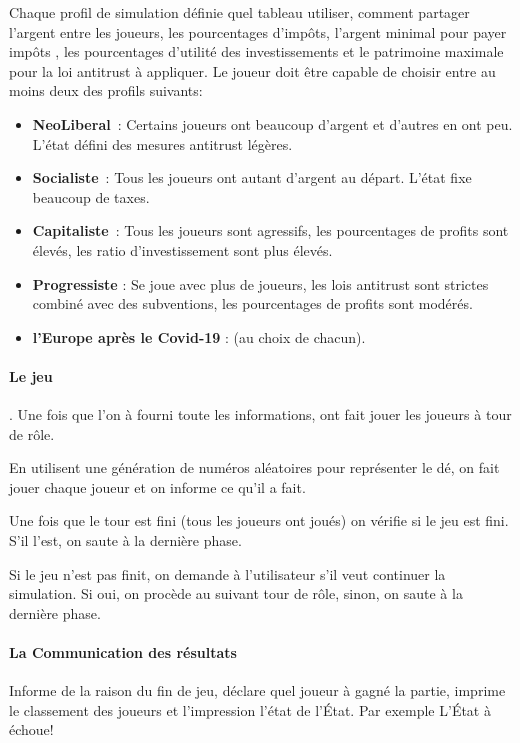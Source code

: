 \documentclass[12pt]{article}
\begin{document}
  Chaque profil de simulation définie quel tableau utiliser, comment partager l'argent entre les joueurs, les pourcentages d'impôts, l'argent minimal pour payer impôts , les pourcentages d'utilité des investissements et le patrimoine maximale pour la loi antitrust à appliquer. 
  Le joueur doit être capable de choisir entre au moins deux des profils suivants: 
  \begin{itemize}
  	\item \textbf{NeoLiberal}~: Certains joueurs ont beaucoup d'argent et d'autres en ont peu. L'état défini des mesures antitrust légères.
  	\item \textbf{Socialiste}~: Tous les joueurs ont autant d'argent au départ. L'état fixe beaucoup de taxes.
  	\item \textbf{Capitaliste}~: Tous les joueurs sont agressifs, les pourcentages de profits sont élevés,  les ratio d'investissement sont plus élevés.
  	\item \textbf{Progressiste} : Se joue avec plus de joueurs, les lois antitrust sont strictes combiné avec des subventions, les pourcentages de profits sont modérés.
  	\item \textbf{l'Europe après le Covid-19} : (au choix de chacun).
\end{itemize}
 
 
  \paragraph{Le jeu}. 
  	Une fois que l'on à fourni toute les informations, ont fait jouer les joueurs à tour de rôle.
	
	 En utilisent une génération de numéros aléatoires pour représenter le dé, on fait jouer chaque joueur et on informe ce qu'il a fait.
	 
	 Une fois que le tour est fini (tous les joueurs ont joués) on vérifie si le jeu est fini. S'il l'est, on saute à la dernière phase. 
	 
	 Si le jeu n'est pas finit, on demande à l'utilisateur s'il veut continuer la simulation. Si oui, on procède au suivant tour de rôle, sinon, on saute à la dernière phase.
	
  
  \paragraph{La Communication des résultats} Informe de la raison du fin de jeu, déclare quel joueur à gagné la partie, imprime le classement des joueurs et l'impression l'état de l'État. 
  	Par exemple
\begingroup\makeatletter\def\@currenvir{verbatim}
\verbatim
	  L'État à échoue! 
	
\end{document}
